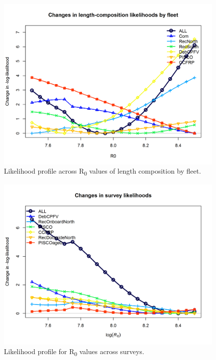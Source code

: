 \documentclass[12pt,]{article}
\begin{document}
\begin{figure}
\centering
\includegraphics{Figures/profile_R0_piner.png}
\caption{Likelihood profile across R\textsubscript{0} values of length
composition by fleet. \label{fig:profile_R0_piner}}
\end{figure}

\begin{figure}
\centering
\includegraphics{Figures/profile_R0_piner2.png}
\caption{Likelihood profile for R\textsubscript{0} values across
surveys. \label{fig:profile_R0_piner2}}
\end{figure}
\end{document}
